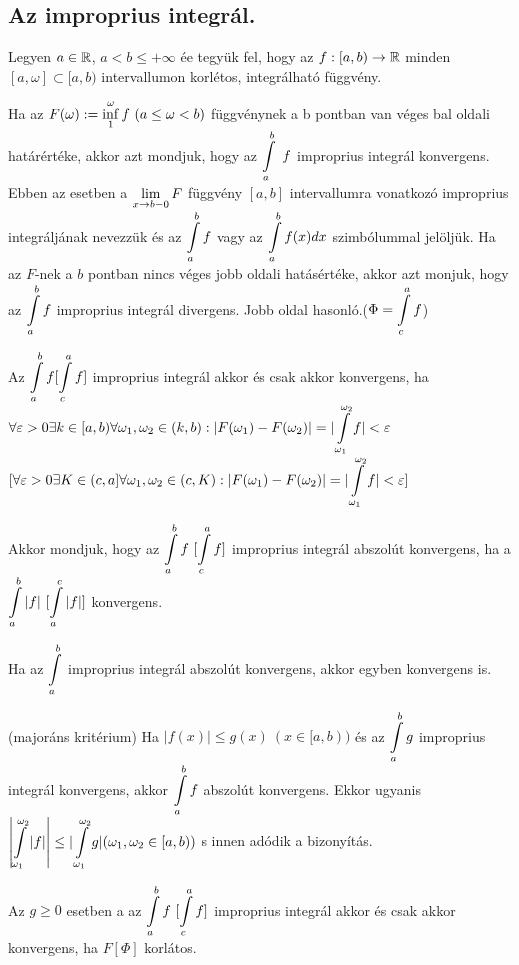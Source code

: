 \subsection{Az improprius integrál.}
Legyen $a\in\mathbb{R}$, $a<b\le+\infty$ ée tegyük fel, hogy az $f:[a,b)\rightarrow\mathbb{R}$
minden $[a,\omega]\subset[a,b)$ intervallumon korlétos, integrálható függvény. 
\begin{de}
  Ha az $F(\omega):=\di\inf_1^\omega f\ (a\le\omega <b)$ függvénynek a b 
  pontban van véges bal oldali határértéke, akkor azt mondjuk, hogy az 
  $\di\Int_a^b\ f$ improprius integrál konvergens. Ebben az esetben a 
  $\displaystyle\lim_{x\to b-0} F$ függvény $[a,b]$ intervallumra vonatkozó improprius 
  integráljának nevezzük és az $\di\Int_a^bf$ vagy az $\di\Int_a^b f(x)dx$ 
  szimbólummal jelöljük. Ha az $F$-nek a $b$ pontban nincs véges jobb oldali 
  hatásértéke, akkor azt monjuk, hogy az $\di\Int_a^bf$ improprius integrál 
  divergens. Jobb oldal hasonló.($\Phi=\di\Int_c^af$)
\end{de}
\begin{te}
  Az $\di\Int_a^bf [\Int_c^af]$ improprius integrál akkor és csak akkor 
  konvergens, ha\\
  $\di\forall\epsilon>0 \exists k\in[a,b) \forall\omega_1,\omega_2\in(k,b): 
  |F(\omega_1)-F(\omega_2)|=|\Int_{\omega_1}^{\omega_2}f|<\epsilon$
  $[\di\forall\epsilon>0 \exists K\in(c,a] \forall\omega_1,\omega_2\in(c,K): 
  |F(\omega_1)-F(\omega_2)|=|\Int_{\omega_1}^{\omega_2}f|<\epsilon]$
\end{te}


\begin{de}
  Akkor mondjuk, hogy az $\di\Int_a^bf\ [\Int_c^af]$ improprius integrál
  abszolút konvergens, ha a $\di\Int_a^b|f|\ [\Int_a^c|f|]$ konvergens.
\end{de}
\begin{kov}
  Ha az $\di\Int_a^b$ improprius integrál abszolút konvergens, akkor egyben 
  konvergens is.
\end{kov}
\begin{kov} (majoráns kritérium)
  Ha $|f(x)|\le g(x)\ (x\in[a,b))$ és az $\di\Int_a^bg$ improprius integrál 
  konvergens, akkor $\di\Int_a^bf$ abszolút konvergens. Ekkor ugyanis $\di\left\vert
  \Int_{\omega_1}^{\omega_2}\textstyle\left\vert f\right\vert\right\vert \le\vert\di \Int_{\omega_1}^
  {\omega_2}g\vert\\ (\omega_1,\omega_2\in[a,b))$ s innen adódik a bizonyítás.
\end{kov}
\begin{kov}
  Az $g\ge0$ esetben a az $\di\Int_a^bf\ [\Int_c^af]$ improprius integrál akkor
  és csak akkor konvergens, ha $F[\Phi]$ korlátos.
\end{kov}

